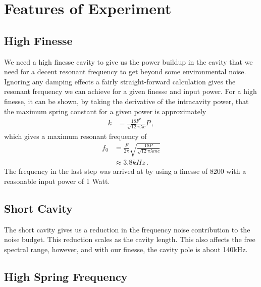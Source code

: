 \section{Features of Experiment}
\subsection{High Finesse}
We need a high finesse cavity to give us the power buildup in the cavity that
we need for a decent resonant frequency to get beyond some environmental noise.
Ignoring any damping effects a fairly straight-forward calculation gives the
resonant frequency we can achieve for a given finesse and input power. For a
high finesse, it can be shown, by taking the derivative of the intracavity power,
that the maximum spring constant for a given power is approximately
\begin{align}
k &= \frac{18 F^2}{\sqrt{12} \pi \lambda c} P \,,
\end{align}
which gives a maximum resonant frequency of
\begin{align}
f_0 &= \frac{F}{2 \pi} \sqrt{\frac{18 P}{\sqrt{12} \pi \lambda m c }} \\
&\approx 3.8kHz \,.
\end{align}
The frequency in the last step was arrived at by using a finesse of 8200
with a reasonable input power of 1 Watt.

\subsection{Short Cavity}
\label{sec:lin_short}
The short cavity gives us a reduction in the frequency noise contribution
to the noise budget. This reduction scales as the cavity length. This also
affects the free spectral range, however, and with our finesse, the cavity
pole is about 140kHz. 

\subsection{High Spring Frequency}

